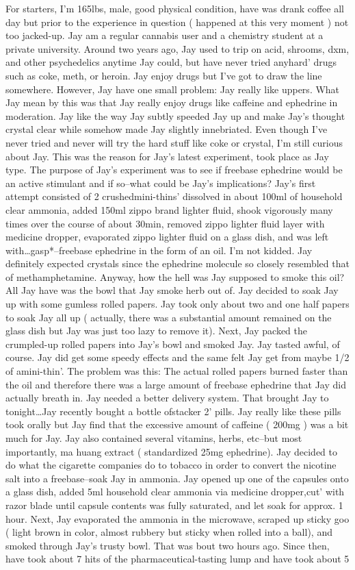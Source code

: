 \documentclass[12pt]{book}
\begin{document}
For starters, I'm 165lbs, male, good physical condition, have was drank coffee all day but prior to the experience in question ( happened at this very moment ) not too jacked-up. Jay am a regular cannabis user and a chemistry student at a private university. Around two years ago, Jay used to trip on acid, shrooms, dxm, and other psychedelics anytime Jay could, but have never tried anyhard' drugs such as coke, meth, or heroin. Jay enjoy drugs but I've got to draw the line somewhere. However, Jay have one small problem: Jay really like uppers. What Jay mean by this was that Jay really enjoy drugs like caffeine and ephedrine in moderation. Jay like the way Jay subtly speeded Jay up and make Jay's thought crystal clear while somehow made Jay slightly innebriated. Even though I've never tried and never will try the hard stuff like coke or crystal, I'm still curious about Jay. This was the reason for Jay's latest experiment, took place as Jay type. The purpose of Jay's experiment was to see if freebase ephedrine would be an active stimulant and if so--what could be Jay's implications? Jay's first attempt consisted of 2 crushedmini-thins' dissolved in about 100ml of household clear ammonia, added 150ml zippo brand lighter fluid, shook vigorously many times over the course of about 30min, removed zippo lighter fluid layer with medicine dropper, evaporated zippo lighter fluid on a glass dish, and was left with\ldots *gasp*--freebase ephedrine in the form of an oil. I'm not kidded. Jay definitely expected crystals since the ephedrine molecule so closely resembled that of methamphetamine. Anyway, how the hell was Jay supposed to smoke this oil? All Jay have was the bowl that Jay smoke herb out of. Jay decided to soak Jay up with some gumless rolled papers. Jay took only about two and one half papers to soak Jay all up ( actually, there was a substantial amount remained on the glass dish but Jay was just too lazy to remove it). Next, Jay packed the crumpled-up rolled papers into Jay's bowl and smoked Jay. Jay tasted awful, of course. Jay did get some speedy effects and the same felt Jay get from maybe 1/2 of amini-thin'. The problem was this: The actual rolled papers burned faster than the oil and therefore there was a large amount of freebase ephedrine that Jay did actually breath in. Jay needed a better delivery system. That brought Jay to tonight\ldots Jay recently bought a bottle ofstacker 2' pills. Jay really like these pills took orally but Jay find that the excessive amount of caffeine ( 200mg ) was a bit much for Jay. Jay also contained several vitamins, herbs, etc--but most importantly, ma huang extract ( standardized 25mg ephedrine). Jay decided to do what the cigarette companies do to tobacco in order to convert the nicotine salt into a freebase--soak Jay in ammonia. Jay opened up one of the capsules onto a glass dish, added 5ml household clear ammonia via medicine dropper,cut' with razor blade until capsule contents was fully saturated, and let soak for approx. 1 hour. Next, Jay evaporated the ammonia in the microwave, scraped up sticky goo ( light brown in color, almost rubbery but sticky when rolled into a ball), and smoked through Jay's trusty bowl. That was bout two hours ago. Since then, have took about 7 hits of the pharmaceutical-tasting lump and have took about 5 
\end{document}
